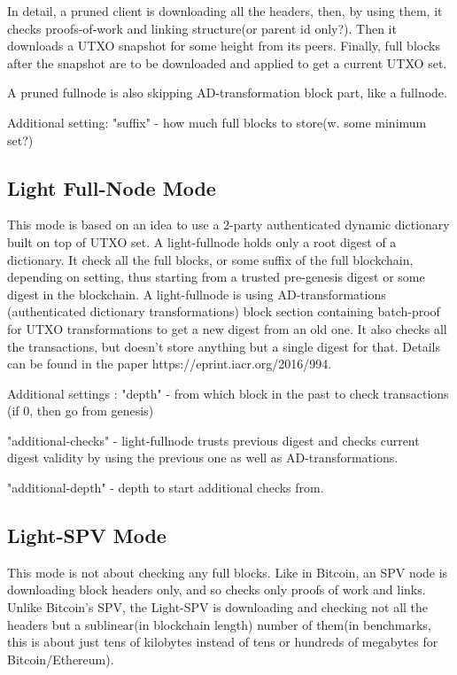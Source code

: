 \documentclass[]{report}   %
\begin{document}
In detail, a pruned client is downloading all the headers, then, by using them,
  it checks proofs-of-work and linking structure(or parent id only?). Then it downloads a UTXO 
  snapshot for some height from its peers. Finally, full blocks after the snapshot are to be downloaded
   and applied to get a current UTXO set.
 
A pruned fullnode is also skipping AD-transformation block part, like a fullnode.      
   
Additional setting: "suffix" - how much full blocks to store(w. some minimum set?)
   
   
\subsection{Light Full-Node Mode}   


This mode is based on an idea to use a 2-party authenticated dynamic dictionary built on top of
UTXO set. A light-fullnode holds only a root digest of a dictionary. It check all the full blocks, or some
suffix of the full blockchain, depending on setting, thus starting from a trusted pre-genesis digest or some digest in 
the blockchain. A light-fullnode is using AD-transformations (authenticated dictionary transformations) block section
containing batch-proof for UTXO transformations to get a new digest from an old one. It also checks all the transactions, 
but doesn't store anything but a single digest for that. Details can be found in the paper 
https://eprint.iacr.org/2016/994.

Additional settings : "depth" - from which block in the past to check transactions (if 0, then go from genesis)

"additional-checks" - %
light-fullnode trusts previous digest and checks current digest validity by using the previous one as well
 as AD-transformations.
 
"additional-depth" - depth to start additional checks from.  

\subsection{Light-SPV Mode}


This mode is not about checking any full blocks. Like in Bitcoin, an SPV node is downloading block headers only,
and so checks only proofs of work and links. Unlike Bitcoin's SPV, the Light-SPV is downloading
 and checking not all the headers but a sublinear(in blockchain length) number of them(in benchmarks, this is about just
 tens of kilobytes instead of tens or hundreds of megabytes for Bitcoin/Ethereum).
 
\end{document}
